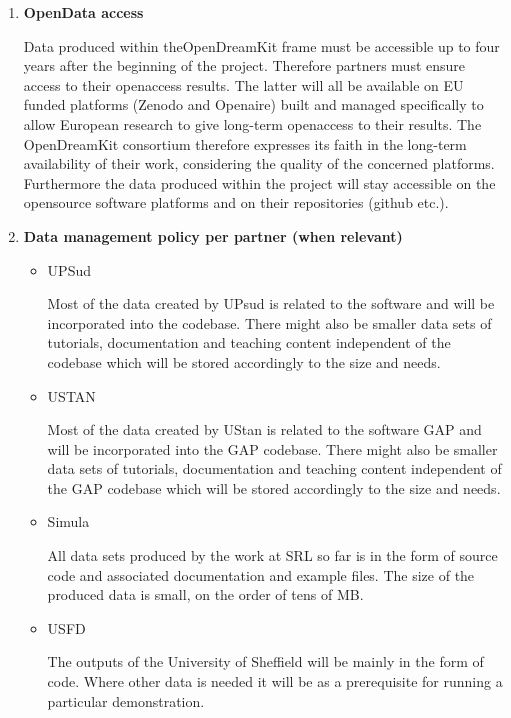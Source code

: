 \documentclass{../../Proposal/LaTeX-proposal/deliverablereport}
\begin{document}
\begin{enumerate}
\item\textbf{OpenData access}

Data produced within theOpenDreamKit frame must be accessible up to four years after the beginning of the project. Therefore partners must ensure access to their openaccess results.
The latter will all be available on EU funded platforms (Zenodo and Openaire) built and managed specifically to allow European research to give long-term openaccess to their results. The OpenDreamKit consortium therefore expresses its faith in the long-term availability of their work, considering the quality of the concerned platforms. Furthermore the data produced within the project will stay accessible on the opensource software platforms and on their repositories (github etc.).


\item\textbf{Data management policy per partner (when relevant)}
\begin{itemize}



\item{UPSud}

Most of the data created by UPsud is related to the software \Sage and will be incorporated into the \Sage codebase. There might also be smaller data sets of tutorials, documentation and teaching content independent of the \Sage codebase which will be stored accordingly to the size and needs.



\item{USTAN}

Most of the data created by UStan is related to the software GAP and will be incorporated into the GAP codebase. There might also be smaller data sets of tutorials, documentation and teaching content independent of the GAP codebase which will be stored accordingly to the size and needs.



\item{Simula}

All data sets produced by the work at SRL so far is in the form of source code and associated documentation and example files. The size of the produced data is small, on the order of tens of MB.



\item{USFD}



The outputs of the University of Sheffield will be mainly in the form of code. Where other data is needed it will be as a prerequisite for running a particular demonstration. 
\end{itemize}
\end{enumerate}
\end{document}
